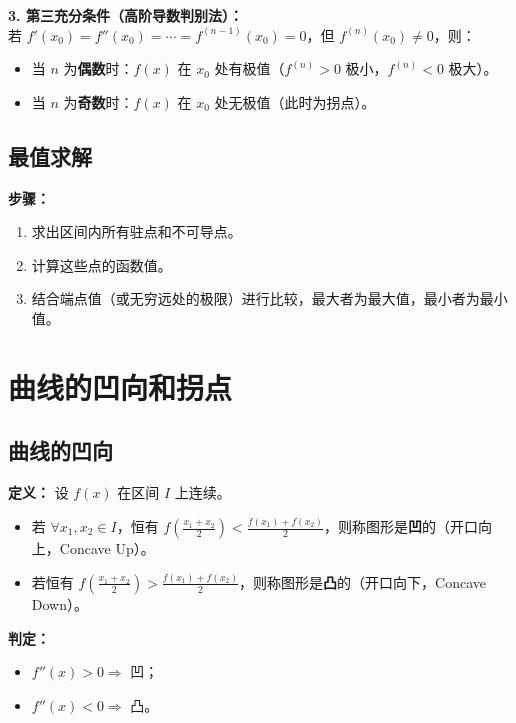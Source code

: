 \documentclass[a4paper,12pt]{ctexart}
\newenvironment{purplebox}
  {\begin{tcolorbox}[colback=white, colframe=boxpurple, boxrule=1pt, sharp corners, title=\textbf{定理/定义}]}
  {\end{tcolorbox}}
\begin{document}
\textbf{3. 第三充分条件（高阶导数判别法）：} \\
若 $f'(x_0) = f''(x_0) = \cdots = f^{(n-1)}(x_0) = 0$，但 $f^{(n)}(x_0) \neq 0$，则：
\begin{itemize}
    \item 当 $n$ 为\textbf{偶数}时：$f(x)$ 在 $x_0$ 处有极值（$f^{(n)} > 0$ 极小，$f^{(n)} < 0$ 极大）。
    \item 当 $n$ 为\textbf{奇数}时：$f(x)$ 在 $x_0$ 处无极值（此时为拐点）。
\end{itemize}

\subsection{最值求解}
\textbf{步骤：}
\begin{enumerate}
    \item 求出区间内所有驻点和不可导点。
    \item 计算这些点的函数值。
    \item 结合端点值（或无穷远处的极限）进行比较，最大者为最大值，最小者为最小值。
\end{enumerate}

\section{曲线的凹向和拐点}

\subsection{曲线的凹向}
\begin{purplebox}
    \textbf{定义：} 设 $f(x)$ 在区间 $I$ 上连续。
    \begin{itemize}
        \item 若 $\forall x_1, x_2 \in I$，恒有 $f\left(\frac{x_1+x_2}{2}\right) < \frac{f(x_1)+f(x_2)}{2}$，则称图形是\textbf{凹}的（开口向上，Concave Up）。
        \item 若恒有 $f\left(\frac{x_1+x_2}{2}\right) > \frac{f(x_1)+f(x_2)}{2}$，则称图形是\textbf{凸}的（开口向下，Concave Down）。
    \end{itemize}
    \textbf{判定：} 
    \begin{itemize}
        \item $f''(x) > 0 \Rightarrow$ 凹；
        \item $f''(x) < 0 \Rightarrow$ 凸。
    \end{itemize}
\end{purplebox}
\end{document}
